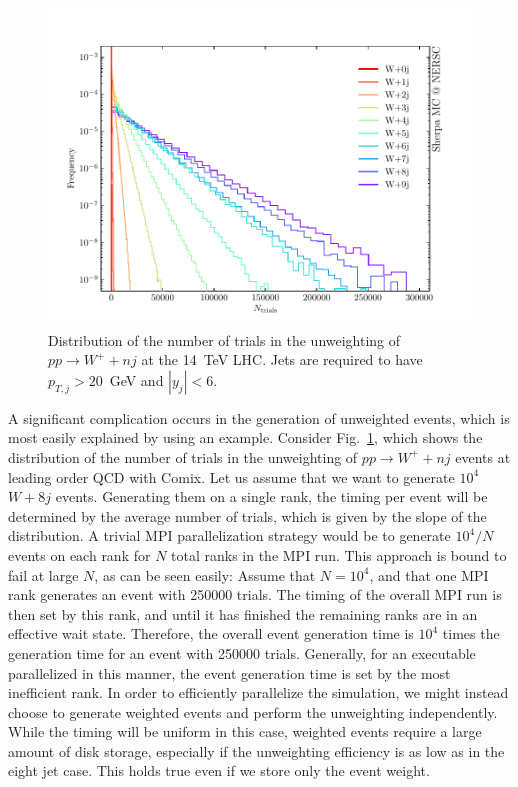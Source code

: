 \documentclass[aps,prd,twocolumn,fleqn,superscriptaddress,groupedaddress,nofootinbib,preprintnumbers]{revtex4}
\begin{document}
\begin{figure}
  \includegraphics[width=\linewidth]{fig/wpj/trials.pdf}
  \caption{Distribution of the number of trials in the unweighting
    of $pp\to W^++nj$ at the 14~TeV LHC. Jets are required to have
    $p_{T,j}>20$~GeV and $|y_j|<6$.}
  \label{fig:number_of_trials}
\end{figure}
A significant complication occurs in the generation of unweighted events,
which is most easily explained by using an example. Consider
Fig.~\ref{fig:number_of_trials}, which shows the distribution of the
number of trials in the unweighting of $pp\to W^++nj$ events at
leading order QCD with Comix. Let us assume that we want to generate
$10^4$ $W+8j$ events. Generating them on a single rank, the timing
per event will be determined by the average number of trials, which
is given by the slope of the distribution. A trivial MPI parallelization
strategy would be to generate $10^4/N$ events on each rank for $N$
total ranks in the MPI run. This approach is bound to fail at large
$N$, as can be seen easily: Assume that $N=10^4$, and that one MPI
rank generates an event with 250000 trials. The timing of the overall
MPI run is then set by this rank, and until it has finished the remaining ranks are in an effective wait state. Therefore, the overall
event generation time is $10^4$ times the generation time for an
event with 250000 trials. Generally, for an executable parallelized
in this manner, the event generation time is set by the most
inefficient rank. In order to efficiently parallelize the simulation,
we might instead choose to generate weighted events and perform the
unweighting independently. While the timing will be uniform in this case,
weighted events require a large amount of disk storage, especially
if the unweighting efficiency is as low as in the eight jet case.
This holds true even if we store only the event weight. 
\end{document}
